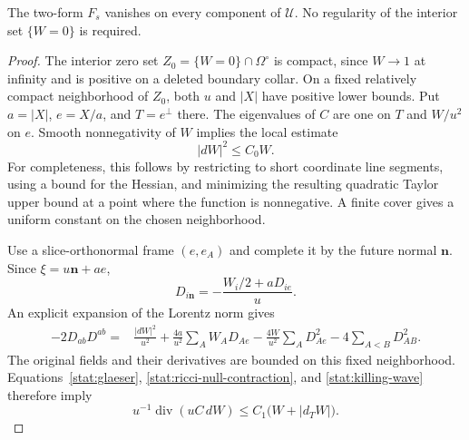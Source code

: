 \begin{lemma}
\label{stat:vanishing-twist}
The two-form $F_s$ vanishes on every component of $\mathcal U$.
No regularity of the interior set $\{W=0\}$ is required.
\end{lemma}

\begin{proof}
The interior zero set
$Z_0=\{W=0\}\cap\Omega^\circ$ is compact, since $W\to1$ at
infinity and is positive on a deleted boundary collar.  On a fixed
relatively compact neighborhood of $Z_0$, both $u$ and $|X|$ have
positive lower bounds.  Put $a=|X|$, $e=X/a$, and $T=e^\perp$ there.
The eigenvalues of $C$ are one on $T$ and $W/u^2$ on $e$.
Smooth nonnegativity of $W$ implies the local estimate
\begin{equation}
 |dW|^2\leq C_0W.
 \label{stat:glaeser}
\end{equation}
For completeness, this follows by restricting to short coordinate
line segments, using a bound for the Hessian, and minimizing the
resulting quadratic Taylor upper bound at a point where the function
is nonnegative.  A finite cover gives a uniform constant on the
chosen neighborhood.

Use a slice-orthonormal frame $(e,e_A)$ and complete it by the future
normal $\mathbf n$.  Since $\xi=u\mathbf n+ae$,
\[
 D_{i\mathbf n}=-\frac{W_i/2+aD_{ie}}u.
\]
An explicit expansion of the Lorentz norm gives
\begin{align}
 -2D_{ab}D^{ab}
 ={}&\frac{|dW|^2}{u^2}
     +\frac{4a}{u^2}\sum_A W_A D_{Ae}
     -\frac{4W}{u^2}\sum_A D_{Ae}^2
     -4\sum_{A<B}D_{AB}^2.
 \label{stat:D-expansion}
\end{align}
The original fields and their derivatives are bounded on this fixed
neighborhood.  Equations~\eqref{stat:glaeser},
\eqref{stat:ricci-null-contraction}, and
\eqref{stat:killing-wave} therefore imply
\begin{equation}
 u^{-1}\operatorname{div}(uC\,dW)
       \leq C_1\bigl(W+|d_TW|\bigr).
 \label{stat:W-inequality}
\end{equation}


\end{proof}
